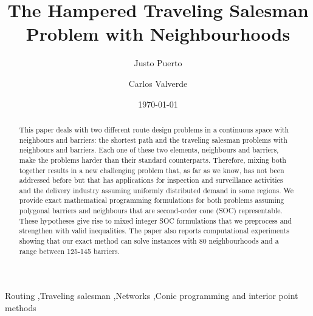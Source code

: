 \documentclass[a4paper,  review, authoryear, 1p.]{elsarticle}
\begin{document}
		
		\begin{frontmatter}
			
			\title{The Hampered Traveling Salesman Problem with Neighbourhoods}
			
			\author[1]{Justo Puerto}%
			\author[2]{Carlos Valverde}
			
			\address[1]{Department of Statistics and Operations Research, University of Seville, Seville, 41012, Spain}
			\address[2]{Department of Statistics and Operations Research, University of Seville, Seville, 41012, Spain}
			
			
			\date{\today}
			
			
			\begin{abstract}
				This paper deals with two different route design problems in a continuous space with neighbours and barriers: the shortest path and the traveling salesman problems with neighbours and barriers. Each one of these two elements, neighbours and barriers, make the problems harder than their standard counterparts. Therefore, mixing both together results in a new challenging problem that, as far as we know, has not been addressed before but that has applications for inspection and surveillance activities and the delivery industry assuming uniformly distributed demand in some regions.
				We provide exact mathematical programming formulations for both problems assuming polygonal barriers and neighbours that are second-order cone (SOC) representable. These hypotheses give rise to mixed integer SOC formulations that we preprocess and strengthen with valid inequalities. The paper also reports computational experiments showing that our exact method can solve instances with 80 neighbourhoods and a range between 125-145 barriers.
			\end{abstract}
			
			\begin{keyword}
				Routing \sep Traveling salesman \sep Networks \sep Conic programming and interior point methods
			\end{keyword}
			
		\end{frontmatter}
		
\end{document}
